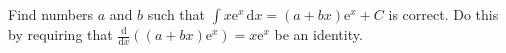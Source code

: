 \documentclass[12pt,fleqn,answers]{exam}
\begin{document}
\begin{questions}

\newpage

\question [1] Find numbers $a$ and $b$ such that
$
 \int x  \mathrm{e}^x \, \mathrm{d} x = (a + b x) \mathrm{e}^x + C
$
is correct. Do this by requiring that
$
\frac{\mathrm{d}}{\mathrm{d} x} \left((a + b x) \mathrm{e}^x \right)
   = x  \mathrm{e}^x
$ be an identity.

\end{questions}
\end{document}
